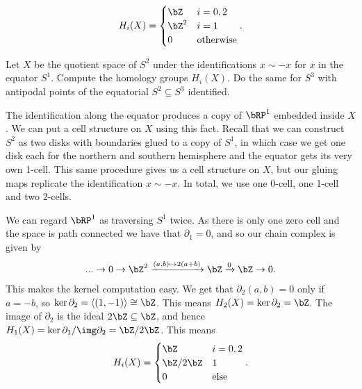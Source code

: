 \begin{homework}[e]
\begin{prf}
    \begin{align*}
      H_i(X) =
      \begin{cases}
        \bZ & i = 0,2 \\
        \bZ^2 & i = 1 \\
        0 & \text{otherwise}
      \end{cases}.
    \end{align*}
  \end{prf}
   Let $X$ be the quotient space of $S^2$ under the identifications $x \sim -x$ for $x$ in the equator $S^1$. Compute the homology groups $H_i(X)$. Do the same for $S^3$ with antipodal points of the equatorial $S^2 \subseteq S^3$ identified.
  \begin{prf}
    The identification along the equator produces a copy of $\bRP^1$ embedded inside $X$. We can put a cell structure on $X$ using this fact. Recall that we can construct $S^2$ as two disks with boundaries glued to a copy of $S^1$, in which case we get one disk each for the northern and southern hemisphere and the equator gets its very own 1-cell. This same procedure gives us a cell structure on $X$, but our gluing maps replicate the identification $x \sim -x$. In total, we use one 0-cell, one 1-cell and two 2-cells.

    We can regard $\bRP^1$ as traversing $S^1$ twice. As there is only one zero cell and the space is path connected we have that $\partial_1 = 0$, and so our chain complex is given by
    \begin{align*}
      ... \to 0 \to \bZ^2 \xrightarrow{(a,b) \mapsto 2(a + b)} \bZ\xrightarrow{0} \bZ \to 0.
    \end{align*}
    This makes the kernel computation easy. We get that $\partial_2(a,b) = 0$ only if $a = -b$, so $\ker\partial_2 = \langle (1,-1) \rangle \cong \bZ$. This means $H_2(X) = \ker\partial_2 = \bZ$. The image of $\partial_2$ is the ideal $2\bZ \subseteq \bZ$, and hence $H_1(X) = \ker\partial_1/\img \partial_2 = \bZ/2\bZ$. This means
    \begin{align*}
      H_i(X) =
      \begin{cases}
        \bZ & i = 0,2 \\
        \bZ/2\bZ & 1 \\
        0 & \text{else}
      \end{cases}.
    \end{align*}
    
    \bigskip


\end{prf}
\end{homework}
